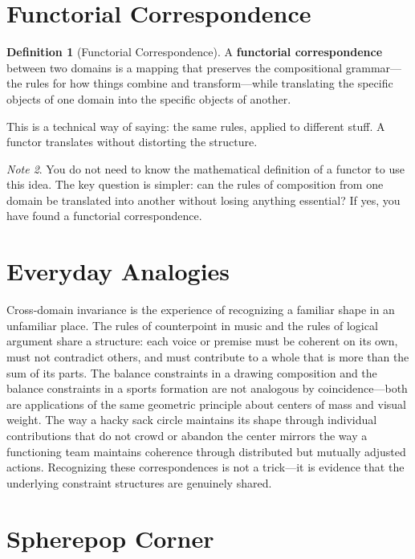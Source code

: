 \documentclass[11pt]{book}
\theoremstyle{definition}
\newtheorem{definition}{Definition}[chapter]
\theoremstyle{remark}
\newtheorem{remark}[definition]{Note}
\begin{document}
\section{Functorial Correspondence}

\begin{definition}[Functorial Correspondence]
A \textbf{functorial correspondence} between two domains is a mapping that
preserves the compositional grammar---the rules for how things combine and
transform---while translating the specific objects of one domain into the
specific objects of another.
\end{definition}

This is a technical way of saying: the same rules, applied to different stuff.
A functor translates without distorting the structure.

\begin{remark}
You do not need to know the mathematical definition of a functor to use
this idea. The key question is simpler: can the rules of composition from
one domain be translated into another without losing anything essential?
If yes, you have found a functorial correspondence.
\end{remark}

\section*{Everyday Analogies}

Cross-domain invariance is the experience of recognizing a familiar
shape in an unfamiliar place. The rules of counterpoint in music and
the rules of logical argument share a structure: each voice or premise
must be coherent on its own, must not contradict others, and must
contribute to a whole that is more than the sum of its parts. The
balance constraints in a drawing composition and the balance constraints
in a sports formation are not analogous by coincidence---both are
applications of the same geometric principle about centers of mass
and visual weight. The way a hacky sack circle maintains its shape
through individual contributions that do not crowd or abandon the
center mirrors the way a functioning team maintains coherence through
distributed but mutually adjusted actions. Recognizing these
correspondences is not a trick---it is evidence that the underlying
constraint structures are genuinely shared.

\section*{Spherepop Corner}
\end{document}
